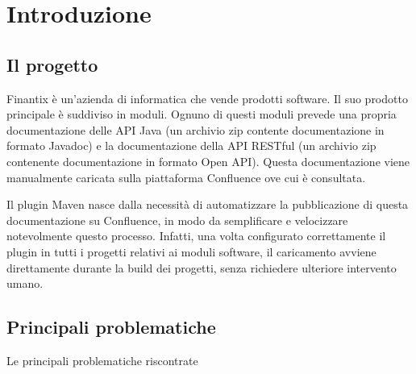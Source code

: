 
\chapter{Introduzione}
\label{cap:introduzione}





\section{Il progetto}
Finantix è un'azienda di informatica che vende prodotti software.
Il suo prodotto principale è suddiviso in moduli.
Ognuno di questi moduli prevede una propria documentazione delle API Java (un archivio zip contente documentazione in formato Javadoc) e la documentazione della API RESTful (un archivio zip contenente documentazione in formato Open API).
Questa documentazione viene manualmente caricata sulla piattaforma Confluence ove cui è consultata.

Il plugin Maven nasce dalla necessità di automatizzare la pubblicazione di questa documentazione su Confluence, in modo da semplificare e velocizzare notevolmente questo processo.
Infatti, una volta configurato correttamente il plugin in tutti i progetti relativi ai moduli software, il caricamento avviene direttamente durante la build dei progetti, senza richiedere ulteriore intervento umano.

\section{Principali problematiche}
Le principali problematiche riscontrate

